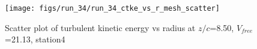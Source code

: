 \begin{figure}[H]
\centering
\texttt{[image: figs/run\_34/run\_34\_ctke\_vs\_r\_mesh\_scatter]}
\caption{Scatter plot of turbulent kinetic energy vs radius at $z/c$=8.50, $V_{free}$=21.13, station4}
\label{fig:run_34_ctke_vs_r_mesh_scatter}
\end{figure}


